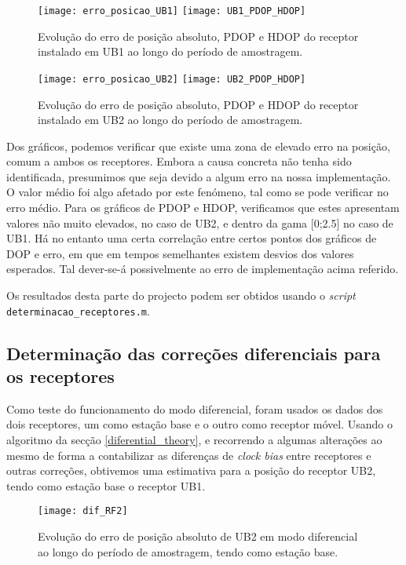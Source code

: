 \documentclass{article}
\begin{document}
\begin{figure}[!ht]
\texttt{[image: erro\_posicao\_UB1]}
\texttt{[image: UB1\_PDOP\_HDOP]}
\caption{Evolução do erro de posição absoluto, PDOP e HDOP do receptor instalado em UB1 ao longo do período de amostragem.}
\label{fig:erro_simples_UB1}
\end{figure}

\begin{figure}[!ht]
\texttt{[image: erro\_posicao\_UB2]}
\texttt{[image: UB2\_PDOP\_HDOP]}
\caption{Evolução do erro de posição absoluto, PDOP e HDOP do receptor instalado em UB2 ao longo do período de amostragem.}
\label{fig:erro_simples_UB2}
\end{figure}

\newpage
Dos gráficos, podemos verificar que existe uma zona de elevado erro na posição, comum a ambos os receptores. Embora a causa concreta não tenha sido identificada, presumimos que seja devido a algum erro na nossa implementação. O valor médio foi algo afetado por este fenómeno, tal como se pode verificar no erro médio. Para os gráficos de PDOP e HDOP, verificamos que estes apresentam valores não muito elevados, no caso de UB2, e dentro da gama [0;2.5] no caso de UB1. Há no entanto uma certa correlação entre certos pontos dos gráficos de DOP e erro, em que em tempos semelhantes existem desvios dos valores esperados. Tal dever-se-á possivelmente ao erro de implementação acima referido.

Os resultados desta parte do projecto podem ser obtidos usando o \textit{script} \texttt{determinacao\_receptores.m}.






\newpage

\subsection{Determinação das correções diferenciais para os receptores}
Como teste do funcionamento do modo diferencial, foram usados os dados dos dois receptores, um como estação base e o outro como receptor móvel. 
Usando o algoritmo da secção \ref{diferential_theory}, e recorrendo a algumas alterações ao mesmo de forma a contabilizar as diferenças de \textit{clock bias} entre receptores e outras correções, obtivemos uma estimativa para a posição do receptor UB2, tendo como estação base o receptor UB1.

\begin{figure}[ht]
\centering
\texttt{[image: dif\_RF2]}
\caption{Evolução do erro de posição absoluto de UB2 em modo diferencial ao longo do período de amostragem, tendo como estação base.}
\label{fig:erro_simples_UB2_diff}
\end{figure}
\end{document}
